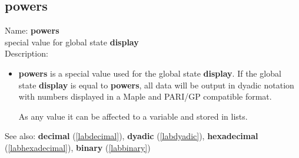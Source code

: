 \subsection{powers}
\label{labpowers}
\noindent Name: \textbf{powers}\\
special value for global state \textbf{display}\\

\noindent Description: \begin{itemize}

\item \textbf{powers} is a special value used for the global state \textbf{display}.  If
   the global state \textbf{display} is equal to \textbf{powers}, all data will be
   output in dyadic notation with numbers displayed in a Maple and
   PARI/GP compatible format.
    
   As any value it can be affected to a variable and stored in lists.
\end{itemize}
See also: \textbf{decimal} (\ref{labdecimal}), \textbf{dyadic} (\ref{labdyadic}), \textbf{hexadecimal} (\ref{labhexadecimal}), \textbf{binary} (\ref{labbinary})
